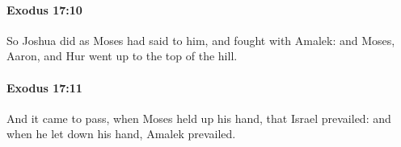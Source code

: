 		\paragraph{Exodus 17:10} %
			\label{EXODUS-17-10}

			So Joshua did as Moses had said to him, and fought with Amalek: and Moses, Aaron, and Hur went up to the top of the hill.


		\paragraph{Exodus 17:11} %
			\label{EXODUS-17-11}

			And it came to pass, when Moses held up his hand, that Israel prevailed: and when he let down his hand, Amalek prevailed.


